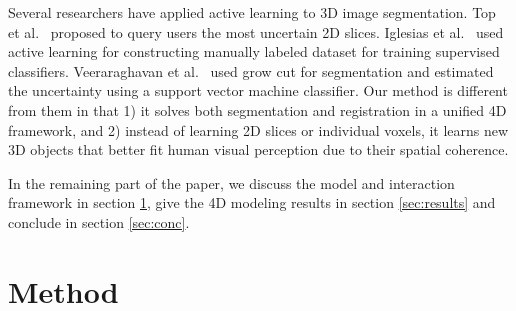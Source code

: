 \documentclass{article}
\begin{document}

Several researchers have applied active learning to 3D image segmentation.  Top
et al.~\cite{top2011active} proposed to query users the most uncertain 2D slices.
Iglesias et al.~\cite{iglesias2011combining} used active learning for
constructing manually labeled dataset for training supervised classifiers.
Veeraraghavan et al.~\cite{veeraraghavan2011active} used grow cut for
segmentation and estimated the uncertainty using a support vector machine
classifier. Our method is different from them in that 1) it solves  both
segmentation and registration in a unified 4D framework, and 2) instead of learning 2D
slices or individual voxels, it learns new 3D objects that better fit human
visual perception due to their spatial coherence.



In the remaining part of the paper, we discuss the model and interaction
framework in section \ref{sec:method}, give the 4D modeling results in section
\ref{sec:results} and conclude in section \ref{sec:conc}.



\section{Method}
\label{sec:method}
\end{document}
